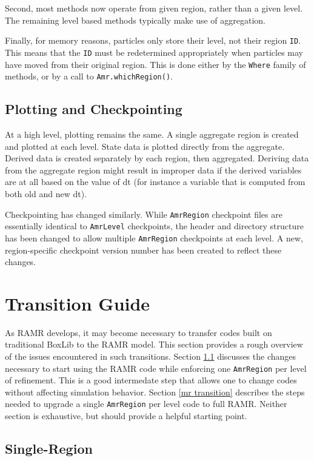 \documentclass[11pt]{article}
\newcommand{\AR}{{\tt AmrRegion}}
\newcommand{\AL}{{\tt AmrLevel}}
\begin{document}
Second, most methods now operate from given region, rather than a 
given level. The remaining level based methods typically make use of 
aggregation.

Finally, for memory reasons, particles only store their level, not 
their region {\tt ID}. This means that the {\tt ID} must be redetermined 
appropriately when particles may have moved from their original 
region. This is done either by the {\tt Where} family of methods, or 
by a call to {\tt Amr.whichRegion()}.

\subsection{Plotting and Checkpointing}

At a high level, plotting remains the same. A single aggregate region 
is created and plotted at each level. State data is plotted directly 
from the aggregate. Derived data is created separately by each region, 
then aggregated. Deriving data from the aggregate region might result 
in improper data if the derived variables are at all based on the 
value of dt (for instance a variable that is computed from both old 
and new dt).

Checkpointing has changed similarly. While \AR{} checkpoint files are 
essentially identical to \AL{} checkpoints, the header and directory 
structure has been changed to allow multiple \AR{} checkpoints at each 
level. A new, region-specific checkpoint version number has been 
created to reflect these changes.


\section{Transition Guide}
\label{transition}

As RAMR develops, it may become necessary to transfer codes built on 
traditional BoxLib to the RAMR model. This section provides a rough 
overview of the issues encountered in such transitions. Section 
\ref{sr transition} discusses the changes necessary to start using the 
RAMR code while enforcing one \AR{} per level of refinement. This is a 
good intermedate step that allows one to change codes without 
affecting simulation behavior. Section \ref{mr transition} describes 
the steps needed to upgrade a single \AR{} per level code to full 
RAMR. Neither section is exhaustive, but should provide a helpful 
starting point.

\subsection{Single-Region}
\label{sr transition}
\end{document}
